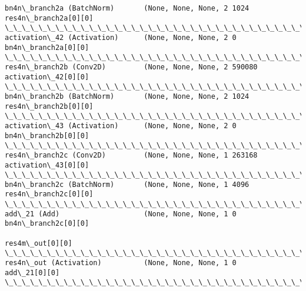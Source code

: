 \documentclass[11pt]{article}
\begin{document}
\begin{Verbatim}[commandchars=\\\{\}]
bn4n\_branch2a (BatchNorm)       (None, None, None, 2 1024        res4n\_branch2a[0][0]             
\_\_\_\_\_\_\_\_\_\_\_\_\_\_\_\_\_\_\_\_\_\_\_\_\_\_\_\_\_\_\_\_\_\_\_\_\_\_\_\_\_\_\_\_\_\_\_\_\_\_\_\_\_\_\_\_\_\_\_\_\_\_\_\_\_\_\_\_\_\_\_\_\_\_\_\_\_\_\_\_\_\_\_\_\_\_\_\_\_\_\_\_\_\_\_\_\_\_
activation\_42 (Activation)      (None, None, None, 2 0           bn4n\_branch2a[0][0]              
\_\_\_\_\_\_\_\_\_\_\_\_\_\_\_\_\_\_\_\_\_\_\_\_\_\_\_\_\_\_\_\_\_\_\_\_\_\_\_\_\_\_\_\_\_\_\_\_\_\_\_\_\_\_\_\_\_\_\_\_\_\_\_\_\_\_\_\_\_\_\_\_\_\_\_\_\_\_\_\_\_\_\_\_\_\_\_\_\_\_\_\_\_\_\_\_\_\_
res4n\_branch2b (Conv2D)         (None, None, None, 2 590080      activation\_42[0][0]              
\_\_\_\_\_\_\_\_\_\_\_\_\_\_\_\_\_\_\_\_\_\_\_\_\_\_\_\_\_\_\_\_\_\_\_\_\_\_\_\_\_\_\_\_\_\_\_\_\_\_\_\_\_\_\_\_\_\_\_\_\_\_\_\_\_\_\_\_\_\_\_\_\_\_\_\_\_\_\_\_\_\_\_\_\_\_\_\_\_\_\_\_\_\_\_\_\_\_
bn4n\_branch2b (BatchNorm)       (None, None, None, 2 1024        res4n\_branch2b[0][0]             
\_\_\_\_\_\_\_\_\_\_\_\_\_\_\_\_\_\_\_\_\_\_\_\_\_\_\_\_\_\_\_\_\_\_\_\_\_\_\_\_\_\_\_\_\_\_\_\_\_\_\_\_\_\_\_\_\_\_\_\_\_\_\_\_\_\_\_\_\_\_\_\_\_\_\_\_\_\_\_\_\_\_\_\_\_\_\_\_\_\_\_\_\_\_\_\_\_\_
activation\_43 (Activation)      (None, None, None, 2 0           bn4n\_branch2b[0][0]              
\_\_\_\_\_\_\_\_\_\_\_\_\_\_\_\_\_\_\_\_\_\_\_\_\_\_\_\_\_\_\_\_\_\_\_\_\_\_\_\_\_\_\_\_\_\_\_\_\_\_\_\_\_\_\_\_\_\_\_\_\_\_\_\_\_\_\_\_\_\_\_\_\_\_\_\_\_\_\_\_\_\_\_\_\_\_\_\_\_\_\_\_\_\_\_\_\_\_
res4n\_branch2c (Conv2D)         (None, None, None, 1 263168      activation\_43[0][0]              
\_\_\_\_\_\_\_\_\_\_\_\_\_\_\_\_\_\_\_\_\_\_\_\_\_\_\_\_\_\_\_\_\_\_\_\_\_\_\_\_\_\_\_\_\_\_\_\_\_\_\_\_\_\_\_\_\_\_\_\_\_\_\_\_\_\_\_\_\_\_\_\_\_\_\_\_\_\_\_\_\_\_\_\_\_\_\_\_\_\_\_\_\_\_\_\_\_\_
bn4n\_branch2c (BatchNorm)       (None, None, None, 1 4096        res4n\_branch2c[0][0]             
\_\_\_\_\_\_\_\_\_\_\_\_\_\_\_\_\_\_\_\_\_\_\_\_\_\_\_\_\_\_\_\_\_\_\_\_\_\_\_\_\_\_\_\_\_\_\_\_\_\_\_\_\_\_\_\_\_\_\_\_\_\_\_\_\_\_\_\_\_\_\_\_\_\_\_\_\_\_\_\_\_\_\_\_\_\_\_\_\_\_\_\_\_\_\_\_\_\_
add\_21 (Add)                    (None, None, None, 1 0           bn4n\_branch2c[0][0]              
                                                                 res4m\_out[0][0]                  
\_\_\_\_\_\_\_\_\_\_\_\_\_\_\_\_\_\_\_\_\_\_\_\_\_\_\_\_\_\_\_\_\_\_\_\_\_\_\_\_\_\_\_\_\_\_\_\_\_\_\_\_\_\_\_\_\_\_\_\_\_\_\_\_\_\_\_\_\_\_\_\_\_\_\_\_\_\_\_\_\_\_\_\_\_\_\_\_\_\_\_\_\_\_\_\_\_\_
res4n\_out (Activation)          (None, None, None, 1 0           add\_21[0][0]                     
\_\_\_\_\_\_\_\_\_\_\_\_\_\_\_\_\_\_\_\_\_\_\_\_\_\_\_\_\_\_\_\_\_\_\_\_\_\_\_\_\_\_\_\_\_\_\_\_\_\_\_\_\_\_\_\_\_\_\_\_\_\_\_\_\_\_\_\_\_\_\_\_\_\_\_\_\_\_\_\_\_\_\_\_\_\_\_\_\_\_\_\_\_\_\_\_\_\_

\end{Verbatim}
\end{document}
